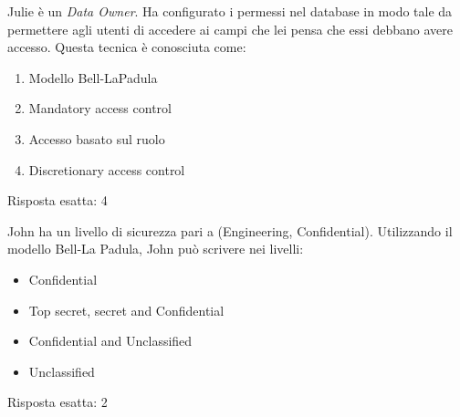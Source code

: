 
\begin{Exercise} [
  title={Domanda},
  label={pass3}
 ]

 \Question Julie è un \textit{Data Owner}. Ha configurato i permessi nel 
database in modo tale da permettere agli utenti di accedere ai campi che lei 
pensa che essi debbano avere accesso. Questa tecnica è conosciuta come:
\begin{enumerate}
 \item Modello Bell-LaPadula
 \item Mandatory access control
 \item Accesso basato sul ruolo
 \item Discretionary access control
\end{enumerate}


\end{Exercise}


\begin{Answer} [
  ref={pass3},
  number={3}
  ]

  \Question Risposta esatta: 4

\end{Answer}


\begin{Exercise} [
  title={Domanda},
  label={pass4}
 ]

 \Question John ha un livello di sicurezza pari a (Engineering, Confidential).
Utilizzando il modello Bell-La Padula, John può scrivere nei livelli:
\begin{itemize}
\item Confidential
\item Top secret, secret and Confidential
\item Confidential and Unclassified
\item Unclassified
\end{itemize}


\end{Exercise}

\begin{Answer} [
  ref={pass4},
  number={4}
  ]

  \Question Risposta esatta: 2

\end{Answer}
